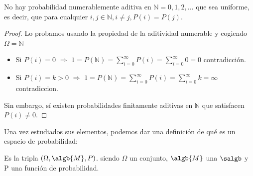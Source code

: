 \documentclass{apuntes}
\begin{document}
\obs No hay probabilidad numerablemente aditiva en $\mathbb{N}={0,1,2,...}$ que sea uniforme, es decir, que para cualquier $i,j \in \mathbb{N}, i \neq j, P({i}) = P({j})$.

\begin{proof}
Lo probamos usando la propiedad de la aditividad numerable y cogiendo $\Omega = \mathbb{N}$
\begin{itemize}
\item Si $P({i})=0$ $\Rightarrow$ $1=P(\mathbb{N})= \sum_{i=0}^{\infty}P({i})= \sum_{i=0}^{\infty}0=0$  contradicción.
\item Si $P({i})=k>0$ $\Rightarrow$ $1=P(\mathbb{N})= \sum_{i=0}^{\infty}P({i})=\sum_{i=0}^{\infty}k = \infty$  contradiccion.
\end{itemize}
Sin embargo, sí existen probabilidades finitamente aditivas en $\mathbb{N}$ que satisfacen $P({i}) \neq 0$.
\end{proof}

Una vez estudiados sus elementos, podemos dar una definición de qué es un espacio de probabilidad:

\begin{defn} Es la tripla $(\Omega, \algb{M}, P)$. siendo $\Omega$ un conjunto, $\algb{M}$ una $\salgb$ y P una función de probabilidad.
\end{defn}
\end{document}
